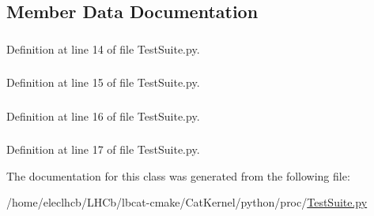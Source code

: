 \subsection{Member Data Documentation}
\hypertarget{classTestSuite_1_1TestSuite_aab040614aa1856540c3350159aa2d400}{
\subsubsection[{s1}]{}}
\label{classTestSuite_1_1TestSuite_aab040614aa1856540c3350159aa2d400}


Definition at line 14 of file TestSuite.py.\hypertarget{classTestSuite_1_1TestSuite_afb317b632353bd3ed504627458247062}{
\subsubsection[{s2}]{}}
\label{classTestSuite_1_1TestSuite_afb317b632353bd3ed504627458247062}


Definition at line 15 of file TestSuite.py.\hypertarget{classTestSuite_1_1TestSuite_a90deb1b548daa550141b71dfeacae780}{
\subsubsection[{s3}]{}}
\label{classTestSuite_1_1TestSuite_a90deb1b548daa550141b71dfeacae780}


Definition at line 16 of file TestSuite.py.\hypertarget{classTestSuite_1_1TestSuite_aa5d3fc0a9e3afb7491c124e4374da5ed}{
\subsubsection[{s4}]{}}
\label{classTestSuite_1_1TestSuite_aa5d3fc0a9e3afb7491c124e4374da5ed}


Definition at line 17 of file TestSuite.py.

The documentation for this class was generated from the following file:\begin{DoxyCompactItemize}
\item 
/home/eleclhcb/LHCb/lbcat-\/cmake/CatKernel/python/proc/\hyperlink{TestSuite_8py}{TestSuite.py}\end{DoxyCompactItemize}
